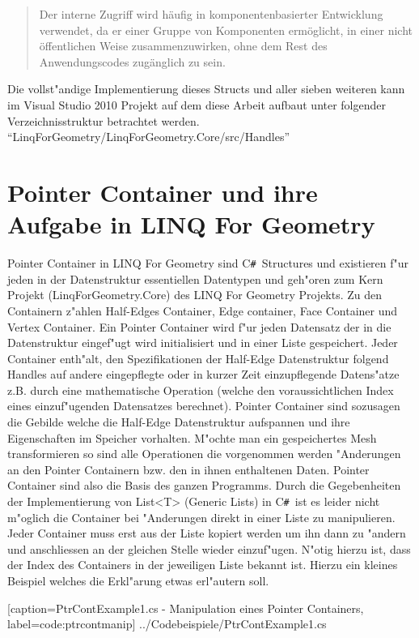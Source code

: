 \documentclass[pagesize, paper=a4, fontsize=12pt,titlepage=true, headings=small, headnosepline, abstractoff, liststotoc, nochapterprefix, plainheadsepline]{scrreprt}
\newcommand{\CSS}{C\texttt{\# }}
\newcommand{\LFG}{LINQ For Geometry}
\newcommand{\LFGS}{LINQ For Geometry }
\newcommand{\HES}{Half-Edge Datenstruktur }
\begin{document}
\begin{quote}{\dq}Der interne Zugriff wird h{\"a}ufig in komponentenbasierter Entwicklung verwendet, da er einer Gruppe von Komponenten erm{\"o}glicht, in einer nicht {\"o}ffentlichen Weise zusammenzuwirken, ohne dem Rest des Anwendungscodes zug{\"a}nglich zu sein.{\dq} \cite{MicrosoftCReferenz.2013}\end{quote}


Die vollst"andige Implementierung dieses Structs und aller sieben weiteren kann im Visual Studio 2010 Projekt auf dem diese Arbeit aufbaut unter folgender Verzeichnisstruktur betrachtet werden. "`LinqForGeometry/LinqForGeometry.Core/src/Handles"'

\section {Pointer Container und ihre Aufgabe in \LFG}
		Pointer Container in \LFGS sind \CSS Structures und existieren f"ur jeden in der Datenstruktur essentiellen Datentypen und geh"oren zum Kern Projekt (LinqForGeometry.Core) des \LFGS Projekts. Zu den Containern z"ahlen Half-Edges Container, Edge container, Face Container und Vertex Container. Ein Pointer Container wird f"ur jeden Datensatz der in die Datenstruktur eingef"ugt wird initialisiert und in einer Liste gespeichert. Jeder Container enth"alt, den Spezifikationen der \HES folgend Handles auf andere eingepflegte oder in kurzer Zeit einzupflegende Datens"atze z.B. durch eine mathematische Operation (welche den voraussichtlichen Index eines einzuf"ugenden Datensatzes berechnet). Pointer Container sind sozusagen die Gebilde welche die Half-Edge Datenstruktur aufspannen und ihre Eigenschaften im Speicher vorhalten. M"ochte man ein gespeichertes Mesh transformieren so sind alle Operationen die vorgenommen werden "Anderungen an den Pointer Containern bzw. den in ihnen enthaltenen Daten. Pointer Container sind also die Basis des ganzen Programms. Durch die Gegebenheiten der Implementierung von List<T> (Generic Lists) in \CSS ist es leider nicht m"oglich die Container bei "Anderungen direkt in einer Liste zu manipulieren. Jeder Container muss erst aus der Liste kopiert werden um ihn dann zu "andern und anschliessen an der gleichen Stelle wieder einzuf"ugen. N"otig hierzu ist, dass der Index des Containers in der jeweiligen Liste bekannt ist. Hierzu ein kleines Beispiel welches die Erkl"arung etwas erl"autern soll.

			[caption={PtrContExample1.cs - Manipulation eines Pointer Containers}, label=code:ptrcontmanip]
			{../Codebeispiele/PtrContExample1.cs}
\end{document}
